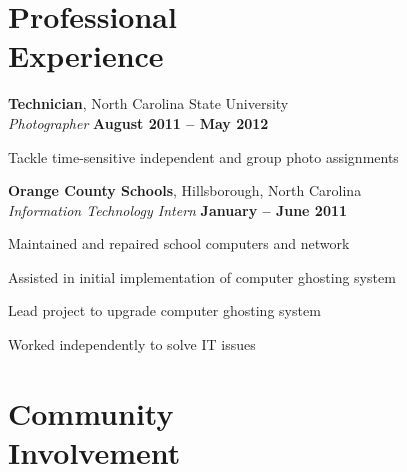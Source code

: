 \documentclass[margin,line,letterpaper]{resume}
\begin{document}
\begin{resume}
    \section{\mysidestyle Professional\\Experience}

    \textbf{Technician}, North Carolina State University \vspace{2mm}\\\vspace{1mm}%
    \textsl{Photographer} \hfill \textbf{August 2011 -- May 2012}\vspace{-3mm}\\\vspace{-1mm}%
    \begin{list2}
    \item Tackle time-sensitive independent and group photo assignments
    \end{list2}\vspace{-1.5mm}

    \textbf{Orange County Schools}, Hillsborough, North Carolina \vspace{2mm}\\\vspace{1mm}%
    \textsl{Information Technology Intern} \hfill \textbf{January -- June 2011}\vspace{-3mm}\\\vspace{-1mm}%
    \begin{list2}
    \item Maintained and repaired school computers and network
    \item Assisted in initial implementation of computer ghosting system 
    \item Lead project to upgrade computer ghosting system
    \item Worked independently to solve IT issues
    \end{list2}\vspace{-1.5mm}


    \section{\mysidestyle Community\\Involvement}


\end{resume}
\end{document}

